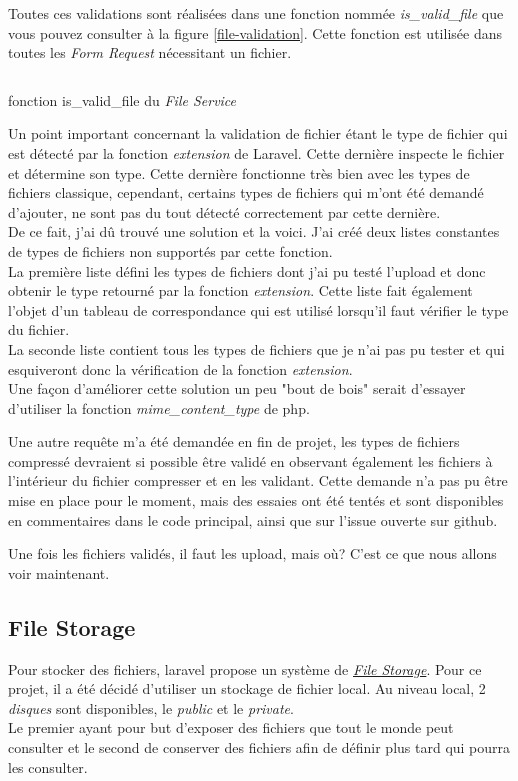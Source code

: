 \documentclass[
    iai, %
    il, %
]{heig-tb}
\begin{document}
Toutes ces validations sont réalisées dans une fonction nommée \emph{is\_valid\_file} que vous pouvez consulter à la figure \ref{file-validation}. Cette fonction est utilisée dans toutes les \emph{Form Request} nécessitant un fichier.

\begin{listing}[h]
    \inputminted{php}{assets/code/FileValidation.php}
    \caption{fonction is\_valid\_file du \emph{File Service} \label{file-validation}}
\end{listing}

Un point important concernant la validation de fichier étant le type de fichier qui est détecté par la fonction \emph{extension} de Laravel. Cette dernière inspecte le fichier et détermine son type. Cette dernière fonctionne très bien avec les types de fichiers classique, cependant, certains types de fichiers qui m'ont été demandé d'ajouter, ne sont pas du tout détecté correctement par cette dernière. \\
De ce fait, j'ai dû trouvé une solution et la voici. J'ai créé deux listes constantes de types de fichiers non supportés par cette fonction. \\
La première liste défini les types de fichiers dont j'ai pu testé l'upload et donc obtenir le type retourné par la fonction \emph{extension}. Cette liste fait également l'objet d'un tableau de correspondance qui est utilisé lorsqu'il faut vérifier le type du fichier. \\
La seconde liste contient tous les types de fichiers que je n'ai pas pu tester et qui esquiveront donc la vérification de la fonction \emph{extension}. \\
Une façon d'améliorer cette solution un peu "bout de bois" serait d'essayer d'utiliser la fonction \emph{mime\_content\_type} de \Gls{php}.

Une autre requête m'a été demandée en fin de projet, les types de fichiers compressé devraient si possible être validé en observant également les fichiers à l'intérieur du fichier compresser et en les validant. Cette demande n'a pas pu être mise en place pour le moment, mais des essaies ont été tentés et sont disponibles en commentaires dans le code principal, ainsi que sur l'issue ouverte sur \Gls{github}.

Une fois les fichiers validés, il faut les upload, mais où? C'est ce que nous allons voir maintenant.

\subsection{File Storage}
Pour stocker des fichiers, \Gls{laravel} propose un système de \href{https://laravel.com/docs/9.x/filesystem}{\emph{File Storage}}. Pour ce projet, il a été décidé d'utiliser un stockage de fichier local. Au niveau local, 2 \emph{disques} sont disponibles, le \emph{public} et le \emph{private}. \\
Le premier ayant pour but d'exposer des fichiers que tout le monde peut consulter et le second de conserver des fichiers afin de définir plus tard qui pourra les consulter. \\
\end{document}
